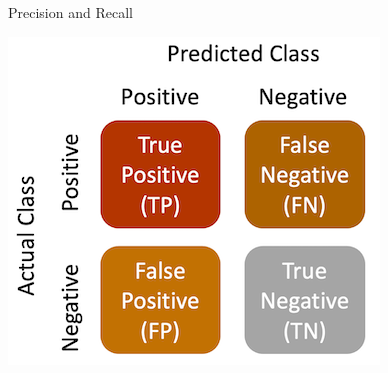 \documentclass[handout]{beamer}
\begin{document}
\begin{frame}{Precision and Recall}
	
	\begin{center}
		\includegraphics{../pictures/confusionmatrix_words.png} \\\
	\end{center}
	
	
	
	
	
\end{frame}
\end{document}
